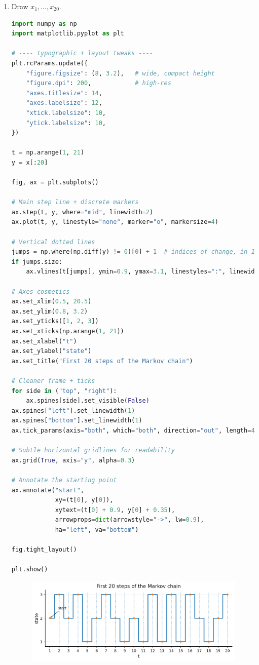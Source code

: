\documentclass[dvipsnames,11pt]{article}
\begin{document}
\begin{enumerate}[label=\alph*.]
        \item Draw $x_1,\dots,x_{20}$.

            \begin{solution}
    
\begin{lstlisting}[language=python]
import numpy as np
import matplotlib.pyplot as plt

# ---- typographic + layout tweaks ----
plt.rcParams.update({
    "figure.figsize": (8, 3.2),   # wide, compact height
    "figure.dpi": 200,            # high-res
    "axes.titlesize": 14,
    "axes.labelsize": 12,
    "xtick.labelsize": 10,
    "ytick.labelsize": 10,
})

t = np.arange(1, 21)
y = x[:20]

fig, ax = plt.subplots()

# Main step line + discrete markers
ax.step(t, y, where="mid", linewidth=2)
ax.plot(t, y, linestyle="none", marker="o", markersize=4)

# Vertical dotted lines
jumps = np.where(np.diff(y) != 0)[0] + 1  # indices of change, in 1..19
if jumps.size:
    ax.vlines(t[jumps], ymin=0.9, ymax=3.1, linestyles=":", linewidth=0.9)

# Axes cosmetics
ax.set_xlim(0.5, 20.5)
ax.set_ylim(0.8, 3.2)
ax.set_yticks([1, 2, 3])
ax.set_xticks(np.arange(1, 21))
ax.set_xlabel("t")
ax.set_ylabel("state")
ax.set_title("First 20 steps of the Markov chain")

# Cleaner frame + ticks
for side in ("top", "right"):
    ax.spines[side].set_visible(False)
ax.spines["left"].set_linewidth(1)
ax.spines["bottom"].set_linewidth(1)
ax.tick_params(axis="both", which="both", direction="out", length=4, width=0.8)

# Subtle horizontal gridlines for readability
ax.grid(True, axis="y", alpha=0.3)

# Annotate the starting point
ax.annotate("start",
            xy=(t[0], y[0]),
            xytext=(t[0] + 0.9, y[0] + 0.35),
            arrowprops=dict(arrowstyle="->", lw=0.9),
            ha="left", va="bottom")

fig.tight_layout()

plt.show()
\end{lstlisting}

                \begin{figure}[ht]
                    \centering
                    \includegraphics[width=0.85\linewidth]{q2c.png}
                \end{figure}
                

\end{solution}
\end{enumerate}
\end{document}
